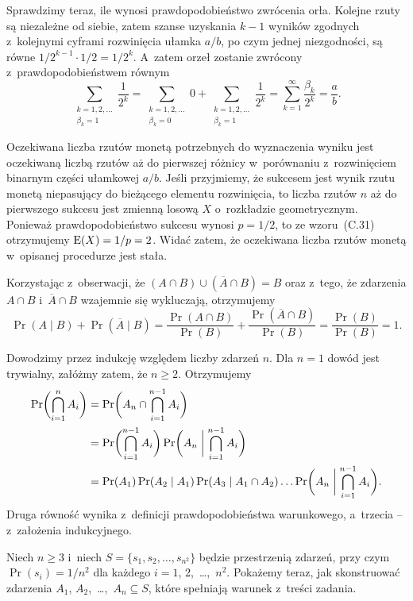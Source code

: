 Sprawdzimy teraz, ile wynosi prawdopodobieństwo zwrócenia orła. Kolejne rzuty są niezależne od siebie, zatem szanse uzyskania $k-1$ wyników zgodnych z~kolejnymi cyframi rozwinięcia ułamka $a/b$, po czym jednej niezgodności, są równe $1/2^{k-1}\cdot1/2=1/2^k$. A~zatem orzeł zostanie zwrócony z~prawdopodobieństwem równym
\[
    \sum_{\substack{k=1,2,\dots\\\beta_k=1}}\frac{1}{2^k} = \sum_{\substack{k=1,2,\dots\\\beta_k=0}}0+\sum_{\substack{k=1,2,\dots\\\beta_k=1}}\frac{1}{2^k} = \sum_{k=1}^\infty\frac{\beta_k}{2^k} = \frac{a}{b}.
\]

Oczekiwana liczba rzutów monetą potrzebnych do wyznaczenia wyniku jest oczekiwaną liczbą rzutów aż do pierwszej różnicy w~porównaniu z~rozwinięciem binarnym części ułamkowej $a/b$. Jeśli przyjmiemy, że sukcesem jest wynik rzutu monetą niepasujący do bieżącego elementu rozwinięcia, to liczba rzutów $n$ aż do pierwszego sukcesu jest zmienną losową $X$ o~rozkładzie geometrycznym. Ponieważ prawdopodobieństwo sukcesu wynosi $p=1/2$, to ze wzoru~(C.31) otrzymujemy $\operatorname{E}(X)=1/p=2$. Widać zatem, że oczekiwana liczba rzutów monetą w~opisanej procedurze jest stała.

\exercise %
Korzystając z~obserwacji, że $(A\cap B)\cup(\overline{A}\cap B)=B$ oraz z~tego, że zdarzenia $A\cap B$ i~$\overline{A}\cap B$ wzajemnie się wykluczają, otrzymujemy
\[
	\Pr(A\mid B)+\Pr(\overline{A}\mid B) = \frac{\Pr(A\cap B)}{\Pr(B)}+\frac{\Pr(\overline{A}\cap B)}{\Pr(B)} = \frac{\Pr(B)}{\Pr(B)} = 1.
\]

\exercise %
Dowodzimy przez indukcję względem liczby zdarzeń $n$. Dla $n=1$ dowód jest trywialny, załóżmy zatem, że $n\ge2$. Otrzymujemy
\begin{align*}
	\Pr\biggl(\bigcap_{i=1}^nA_i\biggr) &= \Pr\biggl(A_n\cap\bigcap_{i=1}^{n-1}A_i\biggr) \\
	&= \Pr\biggl(\bigcap_{i=1}^{n-1}A_i\biggr)\Pr\biggl(A_n\biggm|\bigcap_{i=1}^{n-1}A_i\biggr) \\
	&= \Pr(A_1)\Pr(A_2\mid A_1)\Pr(A_3\mid A_1\cap A_2)\dots\Pr\biggl(A_n\biggm|\bigcap_{i=1}^{n-1}A_i\biggr).
\end{align*}
Druga równość wynika z~definicji prawdopodobieństwa warunkowego, a~trzecia -- z~założenia indukcyjnego.

\exercise %
Niech $n\ge3$ i~niech $S=\{s_1,s_2,\dots,s_{n^2}\}$ będzie przestrzenią zdarzeń, przy czym $\Pr(s_i)=1/n^2$ dla każdego $i=1$, 2,~\dots,~$n^2$. Pokażemy teraz, jak skonstruować zdarzenia $A_1$, $A_2$,~\dots,~$A_n\subseteq S$, które spełniają warunek z~treści zadania.

